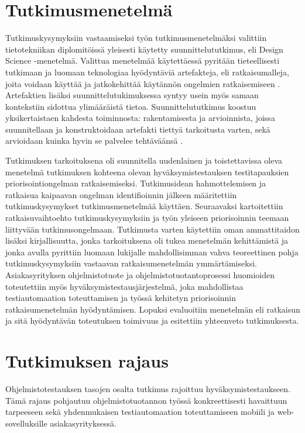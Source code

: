   \section{Tutkimusmenetelmä} \label{ch:06_tutkimusmenetelma}

  Tut\-ki\-mus\-ky\-sy\-myk\-siin vastaamiseksi työn tut\-ki\-mus\-me\-ne\-tel\-mäk\-si valittiin tie\-to\-tek\-nii\-kan dip\-lo\-mi\-töis\-sä  yleisesti käytetty suunnittelututkimus, eli Design Science -menetelmä.
  Valittua menetelmää käytettäessä pyritään tieteellisesti tutkimaan ja luomaan teknologiaa hyödyntäviä artefakteja, eli ratkaisumalleja, joita voidaan käyttää ja jatkokehittää käytännön ongelmien ratkaisemiseen \cite[s.~13-14]{design_science_book}.
  Artefaktien lisäksi suunnittelutukimuksessa syntyy usein myös samaan kontekstiin sidottua ylimääräistä tietoa.
  Suunnittelututkimus koostuu yksikertaistaen kahdesta toiminnosta: rakentamisesta ja arvioinnista, joissa suunnitellaan ja konstruktoidaan artefakti tiettyä tarkoitusta varten, sekä arvioidaan kuinka hyvin se palvelee tehtäväänsä \cite[s.~26]{suunnittelutiede_artikkeli}.

  Tutkimuksen tarkoituksena oli suunnitella uudenlainen ja toistettavissa oleva menetelmä tutkimuksen kohteena olevan hyväksymistestauksen testitapauksien priorisointiongelman ratkaisemiseksi.
  Tutkimusidean hahmottelemisen ja ratkaisua kaipaavan ongelman identifioinnin jälkeen määritettiin tutkimuskysymykset tutkimusmenetelmää käyttäen.
  Seuraavaksi kartoitettiin ratkaisuvaihtoehto tutkimuskysymyksiin ja työn yleiseen priorisoinnin teemaan liittyvään tutkimusongelmaan.
  Tutkimusta varten käytettiin oman ammattitaidon lisäksi kirjallisuutta, jonka tarkoituksena oli tukea menetelmän kehittämistä ja jonka avulla pyrittiin luomaan lukijalle mahdollisimman vahva teoreettinen pohja tutkimuskysymyksiin vastaavan ratkaisumenetelmän ymmärtämiseksi.
  Asiakasyrityksen ohjelmistotuote ja ohjelmistotuotantoprosessi huomioiden toteutettiin myös hyväksymistestausjärjestelmä, joka mahdollistaa testiautomaation toteuttamisen ja työssä kehitetyn priorisoinnin ratkaisumenetelmän hyödyntämisen.
  Lopuksi evaluoitiin menetelmän eli ratkaisun ja sitä hyödyntävän toteutuksen toimivuus ja esitettiin yhteenveto tutkimuksesta.

\section{Tutkimuksen rajaus} \label{ch:06_tutkimuksen_rajaus}

  Ohjelmistotestauksen tasojen osalta tutkimus rajoittuu hyväksymistestaukseen.
  Tämä rajaus pohjautuu ohjelmistotuotannon työssä konkreettisesti havaittuun tarpeeseen sekä yhdenmukaisen testiautomaation toteuttamiseen mobiili ja web-sovelluksille asiakasyrityksessä.

